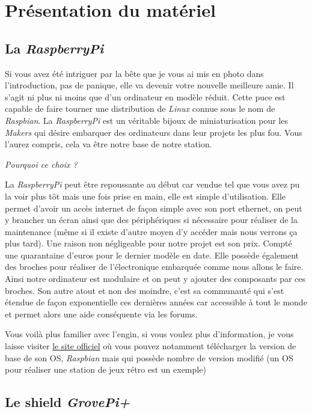 \chapter{Présentation du matériel}

\section{La \textit{RaspberryPi}}

Si vous avez été intriguer par la bête que je vous ai mis en photo dans l'introduction, pas de panique, elle va devenir votre nouvelle meilleure amie. Il s'agit ni plus ni moins que d'un ordinateur en modèle réduit.
Cette puce est capable de faire tourner une distribution de \textit{Linux} connue sous le nom de \textit{Raspbian}. La \textit{RaspberryPi} est un véritable bijoux de miniaturisation pour les \textit{Makers} qui désire embarquer des ordinateurs dans leur projets les plus fou. Vous l'aurez compris, cela va être notre base de notre station.

\textit{Pourquoi ce choix ? }

La \textit{RaspberryPi} peut être repoussante au début car vendue tel que vous avez pu la voir  plus tôt mais une fois prise en main, elle est simple d'utilisation. Elle permet d'avoir un accès internet de façon simple avec son port ethernet, on peut y brancher un écran ainsi que des périphériques si nécessaire pour réaliser de la maintenance (même si il existe d'autre moyen d'y accéder mais nous verrons ça plus tard). 
Une raison non négligeable pour notre projet est son prix. Compté une quarantaine d'euros pour le dernier modèle en date.
Elle possède également des broches pour réaliser de l'électronique embarquée comme nous allons le faire. Ainsi notre ordinateur est modulaire et on peut y ajouter des composants par ces broches.
Son autre atout et non des moindre, c'est sa communauté qui s'est étendue de façon exponentielle ces dernières années car accessible à tout le monde et permet alors une aide conséquente via les forums.

Vous voilà plus familier avec l'engin, si vous voulez plus d'information, je vous laisse visiter \href{https://www.raspberrypi.org/}{le site officiel} où vous pouvez notamment télécharger la version de base de son OS, \textit{Raspbian} mais qui possède nombre de version modifié (un OS pour réaliser une station de jeux rétro est un exemple)

\section{Le shield \textit{GrovePi+}}

